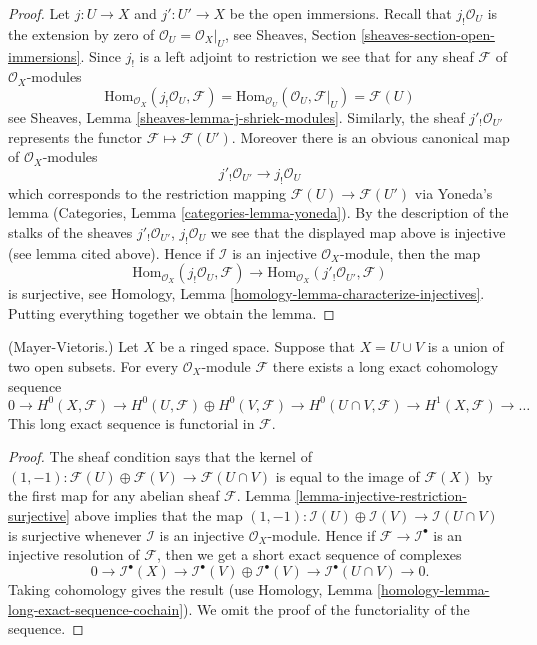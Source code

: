 \begin{proof}
Let $j : U \to X$ and $j' : U' \to X$ be the open immersions.
Recall that $j_!\mathcal{O}_U$ is the extension by zero of
$\mathcal{O}_U = \mathcal{O}_X|_U$, see
Sheaves, Section \ref{sheaves-section-open-immersions}.
Since $j_!$ is a left adjoint to restriction we see that
for any sheaf $\mathcal{F}$ of $\mathcal{O}_X$-modules
$$
\text{Hom}_{\mathcal{O}_X}(j_!\mathcal{O}_U, \mathcal{F})
=
\text{Hom}_{\mathcal{O}_U}(\mathcal{O}_U, \mathcal{F}|_U)
=
\mathcal{F}(U)
$$
see Sheaves, Lemma \ref{sheaves-lemma-j-shriek-modules}.
Similarly, the sheaf $j'_!\mathcal{O}_{U'}$ represents the
functor $\mathcal{F} \mapsto \mathcal{F}(U')$.
Moreover there
is an obvious canonical map of $\mathcal{O}_X$-modules
$$
j'_!\mathcal{O}_{U'} \longrightarrow j_!\mathcal{O}_U
$$
which corresponds to the restriction mapping
$\mathcal{F}(U) \to \mathcal{F}(U')$ via Yoneda's lemma
(Categories, Lemma \ref{categories-lemma-yoneda}). By the description
of the stalks of the sheaves
$j'_!\mathcal{O}_{U'}$, $j_!\mathcal{O}_U$
we see that the displayed map above is injective (see lemma cited above).
Hence if $\mathcal{I}$ is an injective $\mathcal{O}_X$-module,
then the map
$$
\text{Hom}_{\mathcal{O}_X}(j_!\mathcal{O}_U, \mathcal{F})
\longrightarrow
\text{Hom}_{\mathcal{O}_X}(j'_!\mathcal{O}_{U'}, \mathcal{F})
$$
is surjective, see
Homology, Lemma \ref{homology-lemma-characterize-injectives}.
Putting everything together we obtain the lemma.
\end{proof}

\begin{lemma}
\label{lemma-mayer-vietoris}
(Mayer-Vietoris.)
Let $X$ be a ringed space. Suppose that $X = U \cup V$ is a
union of two open subsets. For every $\mathcal{O}_X$-module $\mathcal{F}$
there exists a long exact cohomology sequence
$$
0 \to
H^0(X, \mathcal{F}) \to
H^0(U, \mathcal{F}) \oplus H^0(V, \mathcal{F}) \to
H^0(U \cap V, \mathcal{F}) \to
H^1(X, \mathcal{F}) \to \ldots
$$
This long exact sequence is functorial in $\mathcal{F}$.
\end{lemma}

\begin{proof}
The sheaf condition says that the kernel of
$(1, -1) : \mathcal{F}(U) \oplus \mathcal{F}(V) \to \mathcal{F}(U \cap V)$
is equal to the image of $\mathcal{F}(X)$ by the first map
for any abelian sheaf $\mathcal{F}$.
Lemma \ref{lemma-injective-restriction-surjective} above implies that the map
$(1, -1) : \mathcal{I}(U) \oplus \mathcal{I}(V) \to \mathcal{I}(U \cap V)$
is surjective whenever $\mathcal{I}$ is an injective $\mathcal{O}_X$-module.
Hence if $\mathcal{F} \to \mathcal{I}^\bullet$ is an injective resolution
of $\mathcal{F}$, then we get a short exact sequence of complexes
$$
0 \to
\mathcal{I}^\bullet(X) \to
\mathcal{I}^\bullet(V) \oplus \mathcal{I}^\bullet(V) \to
\mathcal{I}^\bullet(U \cap V) \to
0.
$$
Taking cohomology gives the result (use
Homology, Lemma \ref{homology-lemma-long-exact-sequence-cochain}).
We omit the proof of the functoriality of the sequence.
\end{proof}

